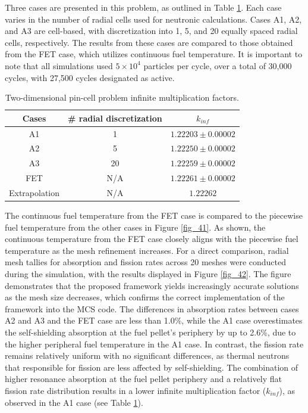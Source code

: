 Three cases are presented in this problem, as outlined in Table \ref{tab2}. Each case varies in the number of radial cells used for neutronic calculations. Cases A1, A2, and A3 are cell-based, with discretization into 1, 5, and 20 equally spaced radial cells, respectively. The results from these cases are compared to those obtained from the FET case, which utilizes continuous fuel temperature. It is important to note that all simulations used $5\times10^4$ particles per cycle, over a total of 30,000 cycles, with 27,500 cycles designated as active.
\begin{table}
    \centering
    \caption{Two-dimensional pin-cell problem infinite multiplication factors.}
    \label{tab2} 
    \begin{tabular}{| c | c | c | }
    \hline 
     Cases & \# radial discretization & $k_{inf}$ \\
     \hline
     A1     & 1   & $1.22203\pm0.00002$      \\ \hline
     A2     & 5   & $1.22250\pm0.00002$      \\ \hline
     A3     & 20  & $1.22259\pm0.00002$      \\ \hline
     FET    & N/A & $1.22261\pm0.00002$      \\ \hline
     Extrapolation    & N/A & $1.22262$      \\ \hline
    \end{tabular}
\end{table}

The continuous fuel temperature from the FET case is compared to the piecewise fuel temperature from the other cases in Figure \ref{fig_41}. As shown, the continuous temperature from the FET case closely aligns with the piecewise fuel temperature as the mesh refinement increases. For a direct comparison, radial mesh tallies for absorption and fission rates across 20 meshes were conducted during the simulation, with the results displayed in Figure \ref{fig_42}. The figure demonstrates that the proposed framework yields increasingly accurate solutions as the mesh size decreases, which confirms the correct implementation of the framework into the MCS code. The differences in absorption rates between cases A2 and A3 and the FET case are less than 1.0\%, while the A1 case overestimates the self-shielding absorption at the fuel pellet's periphery by up to 2.6\%, due to the higher peripheral fuel temperature in the A1 case. In contrast, the fission rate remains relatively uniform with no significant differences, as thermal neutrons that responsible for fission are less affected by self-shielding. The combination of higher resonance absorption at the fuel pellet periphery and a relatively flat fission rate distribution results in a lower infinite multiplication factor ($k_{inf}$), as observed in the A1 case (see Table \ref{tab2}).

